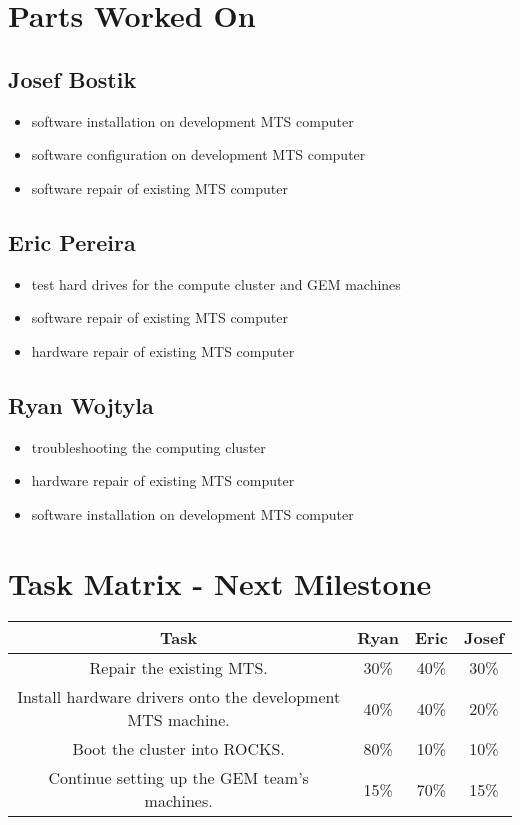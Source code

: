 \documentclass[12pt]{article}
\begin{document}
\section{Parts Worked On}

\subsection{Josef Bostik}

\begin{itemize}
  \item software installation on development MTS computer
  \item software configuration on development MTS computer
  \item software repair of existing MTS computer
\end{itemize}

\subsection{Eric Pereira}

\begin{itemize}
  \item test hard drives for the compute cluster and GEM machines
  \item software repair of existing MTS computer
  \item hardware repair of existing MTS computer
\end{itemize}

\subsection{Ryan Wojtyla}

\begin{itemize}
  \item troubleshooting the computing cluster
  \item hardware repair of existing MTS computer
  \item software installation on development MTS computer
\end{itemize}

\section{Task Matrix - Next Milestone}

\begin{center}
  \begin{tabular}{|c|c|c|c|}
    \hline
    Task & Ryan & Eric & Josef \\
    \hline
    Repair the existing MTS. & 30\% & 40\% & 30\% \\
    Install hardware drivers onto the development MTS machine. & 40\% & 40\% &
                                                                               20\%
    \\
    Boot the cluster into ROCKS. & 80\% & 10\% & 10\% \\
    Continue setting up the GEM team's machines. & 15\% & 70\% & 15\% \\
    \hline
  \end{tabular}
\end{center}
\end{document}
